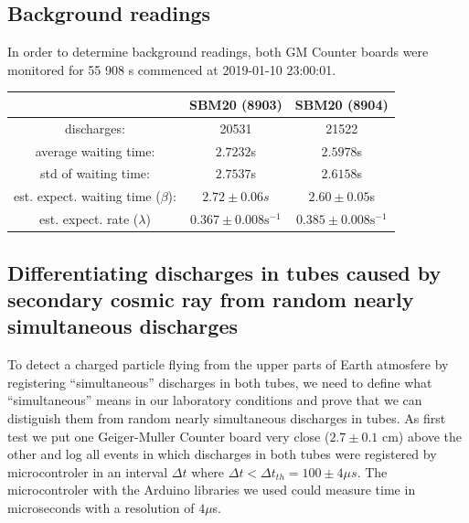 \documentclass[main.tex]{subfiles}
\begin{document}
\subsection{Background readings}
\label{background_readings}
In order to determine background readings, both GM Counter boards were monitored for 55 908 s commenced at 2019-01-10 23:00:01.
\begin{center}

 \begin{tabular}{||c c c||}
 \hline
 & SBM20 (8903) &  SBM20 (8904)\\ 
 \hline\hline
 discharges: & 20531 & 21522\\
 average waiting time: & $2.7232$s & $2.5978$s\\
 std of waiting time: & $2.7537$s & $2.6158$s\\
 est. expect. waiting time ($\beta$): & $2.72\pm 0.06s$ & $2.60 \pm 0.05$s \\
 est. expect. rate ($\lambda$) & $0.367\pm 0.008 \text{s}^{-1}$ & $0.385\pm 0.008 \text{s}^{-1}$ \\
 \hline
\end{tabular}
\end{center}
\subsection{Differentiating discharges in tubes caused by secondary cosmic ray from random nearly simultaneous discharges}

To detect a charged particle flying from the upper parts of Earth atmosfere by registering ``simultaneous'' discharges in both tubes, we need to define what ``simultaneous'' means in our laboratory conditions and prove that we can distiguish them from random nearly simultaneous discharges in tubes. As first test we put one Geiger-Muller Counter board very close ($2.7\pm 0.1$ cm) above the other and log all events in which discharges in both tubes were registered by microcontroler in an interval 
$\Delta t$ where  $\Delta t < \Delta t_{th} = 100\pm 4 \mu s$. The microcontroler with the Arduino libraries we used could measure time in microseconds with a resolution of $4\mu$s.
\end{document}
